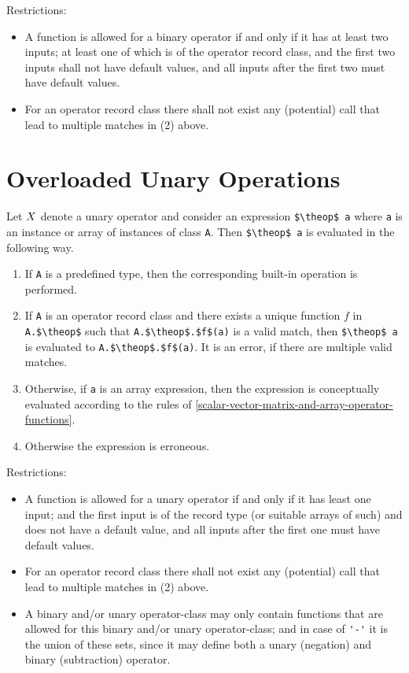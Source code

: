 Restrictions:
\begin{itemize}
\item
  A function is allowed for a binary operator if and only if it has at
  least two inputs; at least one of which is of the operator record
  class, and the first two inputs shall not have default values, and all
  inputs after the first two must have default values.
\item
  For an operator record class there shall not exist any
  (potential) call that lead to multiple matches in (2) above.
\end{itemize}

\section{Overloaded Unary Operations}

Let $X$ denote a unary operator and consider an expression
\lstinline[mathescape=true]!$\theop$ a! where \lstinline!a! is an instance or array of instances of class
\lstinline!A!. Then \lstinline[mathescape=true]!$\theop$ a! is evaluated in the following way.

\begin{enumerate}
\item
  If \lstinline!A! is a predefined type, then the corresponding built-in
  operation is performed.
\item
  If \lstinline!A! is an operator record class and there exists a unique
  function $f$ in \lstinline[mathescape=true]!A.$\theop$! such that \lstinline[mathescape=true]!A.$\theop$.$f$(a)! is a valid
  match, then \lstinline[mathescape=true]!$\theop$ a! is evaluated to \lstinline[mathescape=true]!A.$\theop$.$f$(a)!. It is an
  error, if there are multiple valid matches.
\item
  Otherwise, if \lstinline!a! is an array expression, then the expression
  is conceptually evaluated according to the rules of \autoref{scalar-vector-matrix-and-array-operator-functions}.
\item
  Otherwise the expression is erroneous.
\end{enumerate}

Restrictions:
\begin{itemize}
\item
  A function is allowed for a unary operator if and only if it has least
  one input; and the first input is of the record type (or suitable
  arrays of such) and does not have a default value, and all inputs
  after the first one must have default values.
\item
  For an operator record class there shall not exist any
  (potential) call that lead to multiple matches in (2) above.
\item
  A binary and/or unary operator-class may only contain functions that
  are allowed for this binary and/or unary operator-class; and in case
  of \lstinline!'-'! it is the union of these sets, since it may define both a unary
  (negation) and binary (subtraction) operator.
\end{itemize}


